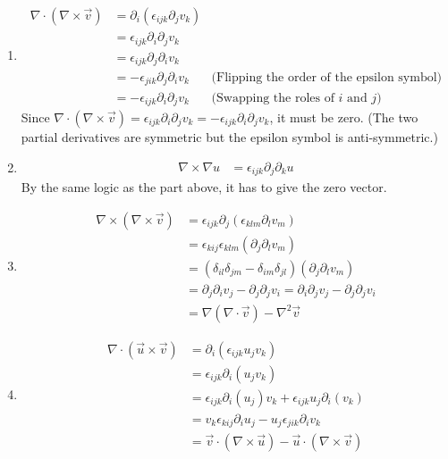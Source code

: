 \begin{Answer}
\begin{enumerate}[label=(\alph*)]
\item
\begin{align*}
\nabla \cdot (\nabla \times \vec{v}) &= \partial_i(\epsilon_{ijk} \partial_j v_k) \\
&= \epsilon_{ijk} \partial_i\partial_j v_k \\
&= \epsilon_{ijk} \partial_j\partial_i v_k \\
&= -\epsilon_{jik} \partial_j\partial_i v_k & \text{(Flipping the order of the epsilon symbol)} \\
&= -\epsilon_{ijk} \partial_i\partial_j v_k & \text{(Swapping the roles of $i$ and $j$)}
\end{align*}
Since $\nabla \cdot (\nabla \times \vec{v}) = \epsilon_{ijk} \partial_i\partial_j v_k = -\epsilon_{ijk} \partial_i\partial_j v_k$, it must be zero. (The two partial derivatives are symmetric but the epsilon symbol is anti-symmetric.)
\item
\begin{align*}
\nabla \times \nabla u &= \epsilon_{ijk} \partial_j \partial_k u    
\end{align*}
By the same logic as the part above, it has to give the zero vector.
\item 
\begin{align*}
\nabla \times (\nabla \times \vec{v}) &= \epsilon_{ijk} \partial_j(\epsilon_{klm} \partial_l v_m) \\
&= \epsilon_{kij}\epsilon_{klm} (\partial_j\partial_l v_m) \\
&= (\delta_{il}\delta_{jm}-\delta_{im}\delta_{jl}) (\partial_j\partial_l v_m) \\
&= \partial_j\partial_i v_j - \partial_j\partial_j v_i = \partial_i\partial_j v_j - \partial_j\partial_j v_i\\
&= \nabla (\nabla \cdot \vec{v}) - \nabla^2 \vec{v} 
\end{align*}
\item 
\begin{align*}
\nabla \cdot (\vec{u} \times \vec{v}) &= \partial_i(\epsilon_{ijk}u_jv_k) \\
&= \epsilon_{ijk}\partial_i(u_jv_k) \\
&= \epsilon_{ijk}\partial_i(u_j)v_k + \epsilon_{ijk}u_j\partial_i(v_k) \\
&= v_k\epsilon_{kij}\partial_iu_j - u_j\epsilon_{jik}\partial_iv_k \\
&= \vec{v} \cdot (\nabla \times \vec{u}) - \vec{u} \cdot (\nabla \times \vec{v})
\end{align*}
\end{enumerate}
\end{Answer}

